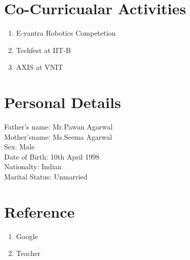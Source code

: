 \documentclass{article}
\begin{document}
\section{Co-Curricualar Activities}
\begin{enumerate}
	\item E-yantra Robotics Competetion
	\item Techfest at IIT-B
	\item AXIS at VNIT
\end{enumerate}
\section{Personal Details}
Father's name: Mr.Pawan Agarwal \\
Mother'sname: Ms.Seema Agarwal \\
Sex: Male \\
Date of Birth: 10th April 1998\\
Nationalty: Indian\\
Marital Status: Unmarried\\
\section{Reference}
\begin{enumerate}
	\item Google
	\item Teacher
\end{enumerate}
\end{document}
